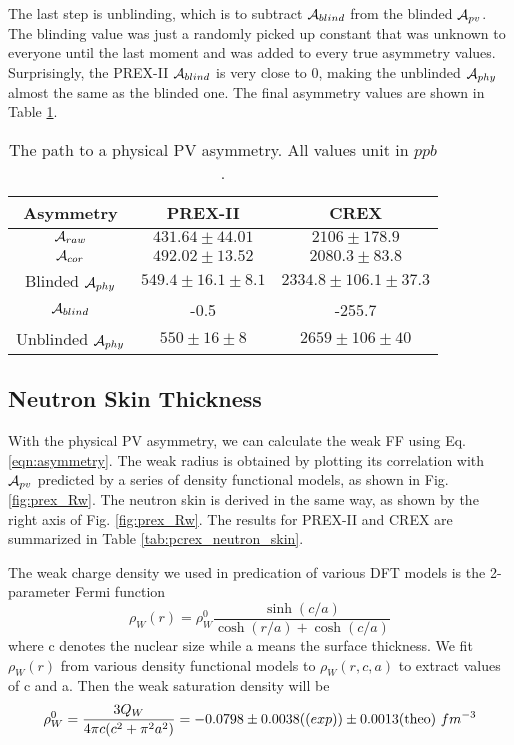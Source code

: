The last step is unblinding, which is to subtract $\mathcal{A}_{blind}$ from the blinded
$\mathcal{A}_{pv}$. The blinding value was just a randomly picked up constant that was unknown to
everyone until the last moment and was added to every true asymmetry values. 
Surprisingly, the PREX-II $\mathcal{A}_{blind}$ is very close to 0, making the unblinded
$\mathcal{A}_{phy}$ almost the same as the blinded one. The final asymmetry values are
shown in Table \ref{tab:pcrex_final_number}.
\begin{table}
    \centering
    \begin{tabular}{c | c c}
	\hline
	Asymmetry   & PREX-II	& CREX	\\
	\hline
	$\mathcal{A}_{raw}$ & $431.64 \pm 44.01$    & $2106 \pm 178.9$	\\
	$\mathcal{A}_{cor}$ & $492.02 \pm 13.52$    & $2080.3 \pm 83.8$	\\
	Blinded $\mathcal{A}_{phy}$ & $549.4 \pm 16.1 \pm 8.1$    & $2334.8 \pm 106.1 \pm 37.3$	\\
	$\mathcal{A}_{blind}$	& -0.5	& -255.7    \\
	\hline
	Unblinded $\mathcal{A}_{phy}$	& $550 \pm 16 \pm 8$	& $2659 \pm 106 \pm 40$	\\
	\hline
    \end{tabular}
    \caption{The path to a physical PV asymmetry. All values unit in $ppb$.}
    \label{tab:pcrex_final_number}
\end{table}

\subsection{Neutron Skin Thickness}
With the physical PV asymmetry, we can calculate the weak FF using Eq. \ref{eqn:asymmetry}.
The weak radius is obtained by plotting its correlation with $\mathcal{A}_{pv}$ predicted
by a series of density functional models, as shown in Fig. \ref{fig:prex_Rw}. The neutron
skin is derived in the same way, as shown by the right axis of Fig. \ref{fig:prex_Rw}.
The results for PREX-II and CREX are summarized in Table \ref{tab:pcrex_neutron_skin}.

The weak charge density we used in predication of various DFT models is the 2-parameter
Fermi function
\begin{equation*}
    \rho_W(r) = \rho_W^0 \frac{\sinh(c/a)}{\cosh(r/a) + \cosh(c/a)}
\end{equation*}
where c denotes the nuclear size while a means the surface thickness. We fit $\rho_W(r)$
from various density functional models to $\rho_W(r, c, a)$ to extract values of
c and a. Then the weak saturation density will be
\begin{equation}
    \rho_W^0 = \frac{3Q_W}{4\pi c (c^2 + \pi^2 a^2)} 
    = -0.0798 \pm 0.0038 (\text(exp)) \pm 0.0013 (\text{theo})\ fm^{-3}
\end{equation}

